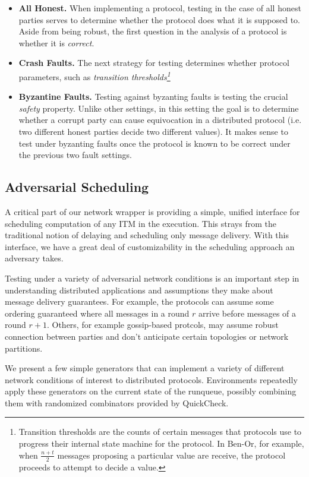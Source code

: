 \begin{itemize}
  \item \textbf{All Honest.} When implementing a protocol, testing in the case of all honest parties serves to determine whether the protocol does what it is supposed to. Aside from being robust, the first question in the analysis of a protocol is whether it is \emph{correct}.
  \item \textbf{Crash Faults.} The next strategy for testing determines whether protocol parameters, such as \emph{transition thresholds\footnote{Transition thresholds are the counts of certain messages that protocols use to progress their internal state machine for the protocol. In Ben-Or, for example, when $\frac{n+t}{2}$ messages proposing a particular value are receive, the protocol proceeds to attempt to decide a value.}}
  \item \textbf{Byzantine Faults.} Testing against byzanting faults is testing the crucial \emph{safety} property. Unlike other settings, in this setting the goal is to determine whether a corrupt party can cause equivocation in a distributed protocol (i.e. two different honest parties decide two different values). It makes sense to test under byzanting faults once the protocol is known to be correct under the previous two fault settings. 
\end{itemize}

\subsection{Adversarial Scheduling}
A critical part of our network wrapper is providing a simple, unified interface for scheduling computation of any ITM in the execution.
This strays from the traditional notion of delaying and scheduling only message delivery.
With this interface, we have a great deal of customizability in the scheduling approach an adversary takes. 

Testing under a variety of adversarial network conditions is an important step in understanding distributed applications and assumptions they make about message delivery guarantees.
For example, the protocols can assume some ordering guaranteed where all messages in a round $r$ arrive before messages of a round $r+1$. 
Others, for example gossip-based protcols, may assume robust connection between parties and don't anticipate certain topologies or network partitions.

We present a few simple generators that can implement a variety of different network conditions of interest to distributed protocols.
Environments repeatedly apply these generators on the current state of the runqueue, possibly combining them with randomized combinators provided by QuickCheck. 

